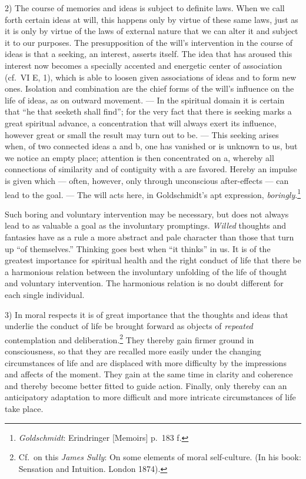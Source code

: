 \documentclass[12pt,a4paper]{book}
\newcommand{\opage}[1]{\marginnote{\footnotesize\textit{[#1]}}}
\begin{document}
2) The course of memories and ideas is subject to definite laws. When we
call forth certain ideas at will, this happens only by virtue of these
same laws, just as it is only by virtue of the laws of external nature
that we can alter it and subject it to our purposes. The presupposition
of the will's intervention in the course of ideas is that a seeking, an
interest, asserts itself. The idea that has aroused this interest now
becomes a specially accented and energetic
\opage{386}center of association (cf.\ VI E, 1), which is able to loosen
given associations of ideas and to form new ones. Isolation and
combination are the chief forms of the will's influence on the life of
ideas, as on outward movement. --- In the spiritual domain it is certain
that ``he that seeketh shall find''; for the very fact that there is
seeking marks a great spiritual advance, a concentration that will always
exert its influence, however great or small the result may turn out to
be. --- This seeking arises when, of two connected ideas a and b, one has
vanished or is unknown to us, but we notice an empty place; attention is
then concentrated on a, whereby all connections of similarity and of
contiguity with a are favored. Hereby an impulse is given which ---
often, however, only through unconscious after-effects --- can lead to the
goal. --- The will acts here, in Goldschmidt's apt expression,
\emph{boringly}.\footnote{\emph{Goldschmidt}: Erindringer [Memoirs]
p.~183 f.}

Such boring and voluntary intervention may be necessary, but does not
always lead to as valuable a goal as the involuntary promptings.
\emph{Willed} thoughts and fantasies have as a rule a more abstract and
pale character than those that turn up ``of themselves.'' Thinking goes
best when ``it thinks'' in us. It is of the greatest importance for
spiritual health and the right conduct of life that there be a harmonious
relation between the involuntary unfolding of the life of thought and
voluntary intervention. The harmonious relation is no doubt different for
each single individual.

3) In moral respects it is of great importance that the thoughts and
ideas that underlie the conduct of life be brought forward as objects of
\emph{repeated} contemplation and deliberation.\footnote{Cf.\ on this
\emph{James Sully}: On some elements of moral self-culture. (In his book:
Sensation and Intuition. London 1874).} They thereby gain firmer ground
in consciousness, so that they are recalled more easily under the
changing circumstances of life and are displaced with more difficulty by
the impressions and affects of the moment. They gain at the same time in
clarity and coherence and thereby become better fitted to guide action.
Finally, only thereby can an anticipatory adaptation to more difficult
and more intricate circumstances of life take place.
\end{document}
